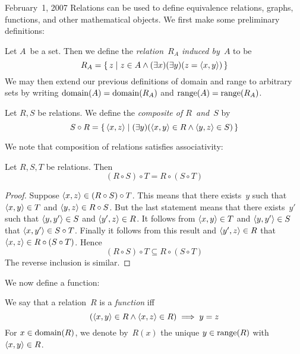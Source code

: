 \begin{lecture}{February~1, 2007}
Relations can be used to define equivalence relations, graphs, functions, and other mathematical objects. We first make some preliminary definitions:
\begin{defn}
Let \(A\)~be a set. Then we define the \emph{relation~\(R_A\) induced by~\(A\)} to be
\[R_A=\{\,z\mid z\in A\land(\exists x)(\exists y)(z=\langle{x},{y}\rangle)\,\}\]
We may then extend our previous definitions of domain and range to arbitrary sets by writing \(\operatorname{domain}(A)=\operatorname{domain}(R_A)\) and \(\operatorname{range}(A)=\operatorname{range}(R_A)\).
\end{defn}
\begin{defn}
Let \(R,S\) be relations. We define the \emph{composite of \(R\)~and~\(S\)} by
\[S\circ R=\{\,\langle{x},{z}\rangle\mid(\exists y)(\langle{x},{y}\rangle\in R\land\langle{y},{z}\rangle\in S)\,\}\]
\end{defn}
\noindent We note that composition of relations satisfies associativity:
\begin{prop}
Let \(R,S,T\) be relations. Then
\[(R\circ S)\circ T=R\circ(S\circ T)\]
\end{prop}
\begin{proof}
Suppose \(\langle{x},{z}\rangle\in(R\circ S)\circ T\). This means that there exists~\(y\) such that \(\langle{x},{y}\rangle\in T\) and \(\langle{y},{z}\rangle\in R\circ S\). But the last statement means that there exists~\(y'\) such that \(\langle{y},{y'}\rangle\in S\) and \(\langle{y'},{z}\rangle\in R\). It follows from \(\langle{x},{y}\rangle\in T\) and \(\langle{y},{y'}\rangle\in S\) that \(\langle{x},{y'}\rangle\in S\circ T\). Finally it follows from this result and \(\langle{y'},{z}\rangle\in R\) that \(\langle{x},{z}\rangle\in R\circ(S\circ T)\). Hence
\[(R\circ S)\circ T\subseteq R\circ(S\circ T)\]
The reverse inclusion is similar.
\end{proof}
We now define a function:
\begin{defn}
We say that a relation~\(R\) is a \emph{function} iff
\[(\langle{x},{y}\rangle\in R\land\langle{x},{z}\rangle\in R)\implies y=z\]
For \(x\in\operatorname{domain}(R)\), we denote by~\(R(x)\) the unique \(y\in\operatorname{range}(R)\) with \(\langle{x},{y}\rangle\in R\).
\end{defn}
\end{lecture}

